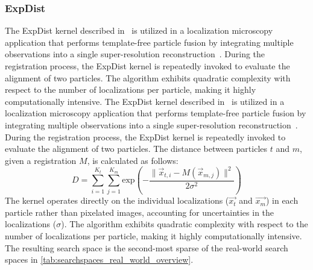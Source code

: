 
\subsubsection{ExpDist} \label{subsubsec:evaluation_setup_kernel_expdist}
\iflackofspace
The ExpDist kernel described in~\cite{BenchmarkingSuiteKerneltuners} is utilized in a localization microscopy application that performs template-free particle fusion by integrating multiple observations into a single super-resolution reconstruction~\cite{heydarian2018template}. During the registration process, the ExpDist kernel is repeatedly invoked to evaluate the alignment of two particles.
The algorithm exhibits quadratic complexity with respect to the number of localizations per particle, making it highly computationally intensive. 
\else
The ExpDist kernel described in~\cite{BenchmarkingSuiteKerneltuners} is utilized in a localization microscopy application that performs template-free particle fusion by integrating multiple observations into a single super-resolution reconstruction~\cite{heydarian2018template}. During the registration process, the ExpDist kernel is repeatedly invoked to evaluate the alignment of two particles. The distance between particles $t$ and $m$, given a registration $M$, is calculated as follows:
\begin{equation}
    D = \sum\limits_{i=1}^{K_t} \sum\limits_{j=1}^{K_m} \textrm{exp}\left( - \frac{\|\vec{x}_{t,i} - M(\vec{x}_{m,j})\|^2 }{ 2\sigma^2} \right)
\end{equation}
The kernel operates directly on the individual localizations ($\vec{x_t}$ and $\vec{x_m}$) in each particle rather than pixelated images, accounting for uncertainties in the localizations ($\sigma$). The algorithm exhibits quadratic complexity with respect to the number of localizations per particle, making it highly computationally intensive. 
\fi
The resulting search space is the second-most sparse of the real-world search spaces in \cref{tab:searchspaces_real_world_overview}.

